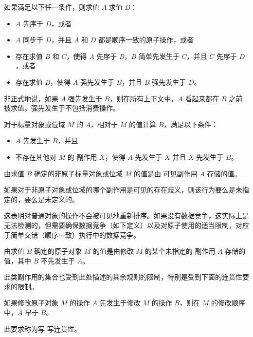 \pnum
如果满足以下任一条件，则求值 $A$  求值 $D$：
\begin{itemize}
\item $A$ 先序于 $D$，或者
\item $A$ 同步于 $D$，并且 $A$ 和 $D$ 都是顺序一致的原子操作，或者
\item 存在求值 $B$ 和 $C$，使得 $A$ 先序于 $B$，$B$ 简单先发生于 $C$，并且 $C$ 先序于 $D$，或者
\item 存在求值 $B$，使得 $A$ 强先发生于 $B$，并且 $B$ 强先发生于 $D$。
\end{itemize}
\begin{note}
非正式地说，如果 $A$ 强先发生于 $B$，则在所有上下文中，$A$ 看起来都在 $B$ 之前被求值。强先发生于不包括消费操作。
\end{note}

\pnum
对于标量对象或位域 $M$ 的 $A$，相对于 $M$ 的值计算 $B$，满足以下条件：
\begin{itemize}
\item $A$ 先发生于 $B$，并且
\item 不存在其他对 $M$ 的
%
副作用 $X$，使得 $A$ 先发生于 $X$ 并且 $X$ 先发生于 $B$。
\end{itemize}

由求值 $B$ 确定的非原子标量对象或位域 $M$ 的值是由
%
可见副作用 $A$ 存储的值。
\begin{note}
如果对于非原子对象或位域的哪个副作用是可见的存在歧义，则该行为要么是未指定的，要么是未定义的。
\end{note}
\begin{note}
这表明对普通对象的操作不会被可见地重新排序。如果没有数据竞争，这实际上是无法检测的，但需要确保数据竞争（如下定义）以及对原子使用的适当限制，对应于简单交错（顺序一致）执行中的数据竞争。
\end{note}

\pnum
由求值 $B$ 确定的原子对象 $M$ 的值是由修改 $M$ 的某个未指定的
副作用 $A$ 存储的值，其中 $B$ 不先发生于 $A$。
\begin{note}
此类副作用的集合也受到此处描述的其余规则的限制，特别是受到下面的连贯性要求的限制。
\end{note}

\pnum
{}%
如果修改原子对象 $M$ 的操作 $A$ 先发生于修改 $M$ 的操作 $B$，则在 $M$ 的修改顺序中，$A$ 早于 $B$。
\begin{note}
此要求称为写-写连贯性。
\end{note}

